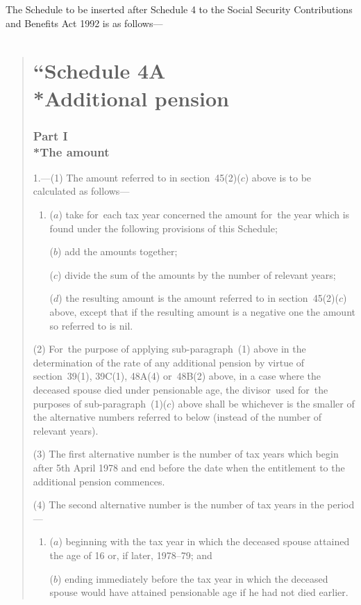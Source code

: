 \documentclass[12pt,a4paper]{article}
\begin{document}
\noindent
The Schedule to be inserted after Schedule 4 to the Social Security Contributions and Benefits Act 1992 is as follows—
\begin{quotation}
\part*{\noindent “Schedule 4A\\*Additional pension}

\section*{Part I\\*The amount}

1.---(1) The amount referred to in section~45(2)($c$)  above is to be calculated as follows—
\begin{enumerate}\item[]
($a$) take for~each tax year concerned the amount for~the year which is found under the following provisions of this Schedule;

($b$) add the amounts together;

($c$) divide the sum of the amounts by the number of relevant years;

($d$) the resulting amount is the amount referred to in section~45(2)($c$)  above, except that if the resulting amount is a negative one the amount so referred to is nil.
\end{enumerate}

(2) For~the purpose of applying sub-paragraph~(1)  above in the determination of the rate of any additional pension by virtue of section~39(1), 39C(1), 48A(4)  or~48B(2)  above, in a case where the deceased spouse died under pensionable age, the divisor~used for~the purposes of sub-paragraph~(1)($c$)  above shall be whichever is the smaller of the alternative numbers referred to below (instead of the number of relevant years).

(3) The first alternative number is the number of tax years which begin after 5th April 1978 and end before the date when the entitlement to the additional pension commences.

(4) The second alternative number is the number of tax years in the period—
\begin{enumerate}\item[]
($a$) beginning with the tax year in which the deceased spouse attained the age of 16 or, if later, 1978--79; and

($b$) ending immediately before the tax year in which the deceased spouse would have attained pensionable age if he had not died earlier.
\end{enumerate}


\end{quotation}
\end{document}
